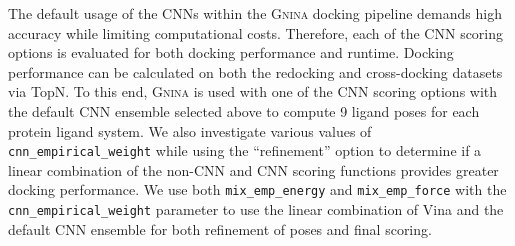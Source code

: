 \documentclass[journal=jcisd8,manuscript=article]{achemso}
\begin{document}
The default usage of the CNNs within the \textsc{Gnina} docking pipeline demands high accuracy while limiting computational costs. Therefore, each of the CNN scoring options is evaluated for both docking performance and runtime. Docking performance can be calculated on both the redocking and cross-docking datasets via TopN. To this end, \textsc{Gnina} is used with one of the CNN scoring options with the default CNN ensemble selected above to compute 9 ligand poses for each protein ligand system. We also investigate various values of \texttt{cnn\_empirical\_weight} while using the ``refinement'' option to determine if a linear combination of the non-CNN and CNN scoring functions provides greater docking performance. We use both \texttt{mix\_emp\_energy} and \texttt{mix\_emp\_force} with the \texttt{cnn\_empirical\_weight} parameter to use the linear combination of Vina and the default CNN ensemble for both refinement of poses and final scoring.
\end{document}
